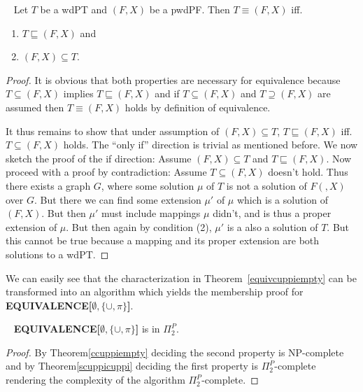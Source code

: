 \begin{theorem}~\cite{pichler2014containment}\label{equivcuppiempty}
Let $T$ be a wdPT and $(F,X)$ be a pwdPF.
Then $T \equiv (F,X)$ iff.
\begin{enumerate}
\item $T \sqsubseteq (F,X)$ and
\item $(F,X) \subseteq T$.
\end{enumerate}
\end{theorem}
\begin{proof}
It is obvious that both properties are necessary for equivalence because 
$T \subseteq (F,X)$ implies $T \sqsubseteq (F,X)$ and if  $T \subseteq (F,X)$
and
$T \supseteq (F,X)$ are assumed then $T \equiv (F,X)$ holds by definition of equivalence.

It thus remains to show that  under assumption of 
$(F,X) \subseteq T$, $T \sqsubseteq (F,X)$ iff. $T \subseteq (F,X)$  holds. 
The ``only if'' direction is trivial as mentioned before.
We now sketch the proof of the if direction:
Assume  $(F,X) \subseteq T$ and $T \sqsubseteq (F,X)$.
Now proceed with a proof by contradiction: Assume $T \subseteq (F,X)$ doesn't
hold. Thus there exists a graph $G$, where some solution $\mu$ of $T$ is not a
solution of $F(,X)$ over $G$. But there we can find some extension $\mu'$ of
$\mu$ which is a solution of $(F,X)$. But then $\mu'$ must include mappings
$\mu$ didn't, and is thus a proper extension of $\mu$. But then again by
condition (2), $\mu'$ is a also a solution of $T$. But this cannot be true
because a mapping and its proper extension are both solutions to a wdPT. 
\end{proof}
We can easily see that the characterization in Theorem~\ref{equivcuppiempty} can be
transformed into an algorithm which yields the membership proof for
\textbf{EQUIVALENCE[$\emptyset,\{\cup,\pi\}$]}.
\begin{theorem}~\cite{pichler2014containment}
	\textbf{EQUIVALENCE[$\emptyset,\{\cup,\pi\}$]} is in $\Pi_2^P$.
\end{theorem}
\begin{proof}
By Theorem\ref{ccuppiempty} deciding the second property is NP-complete and
by Theorem\ref{scuppicuppi} deciding the first property is $\Pi_2^P$-complete
rendering the complexity of the algorithm $\Pi_2^P$-complete.
\end{proof}


